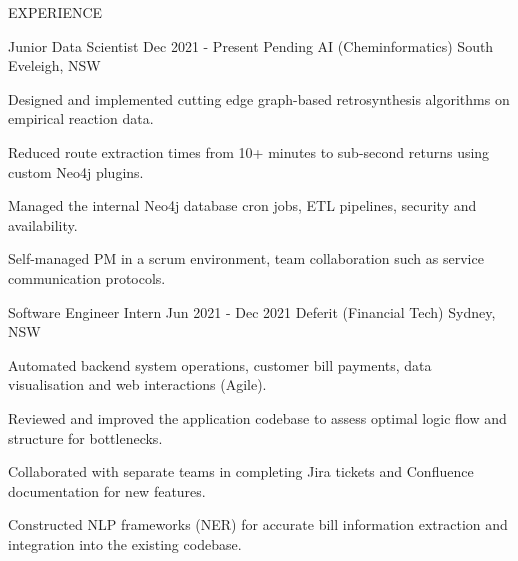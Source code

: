 
\begin{ResumeSection}{EXPERIENCE}

    \begin{DatedField}
        {Junior Data Scientist}
        {Dec 2021 - Present}
        {Pending AI (Cheminformatics)}
        {South Eveleigh, NSW}
        \item Designed and implemented cutting edge graph-based retrosynthesis algorithms on empirical reaction data.
        \item Reduced route extraction times from 10+ minutes to sub-second returns using custom Neo4j plugins.
        \item Managed the internal Neo4j database cron jobs, ETL pipelines, security and availability.
        \item Self-managed PM in a scrum environment, team collaboration such as service communication protocols.
    \end{DatedField}
    
    \begin{DatedField}
        {Software Engineer Intern}
        {Jun 2021 - Dec 2021}
        {Deferit (Financial Tech)}
        {Sydney, NSW}
        \item Automated backend system operations, customer bill payments, data visualisation and web interactions (Agile).
        \item Reviewed and improved the application codebase to assess optimal logic flow and structure for bottlenecks.
        \item Collaborated with separate teams in completing Jira tickets and Confluence documentation for new features.
        \item Constructed NLP frameworks (NER) for accurate bill information extraction and integration into the existing codebase.
    \end{DatedField}

\end{ResumeSection} 